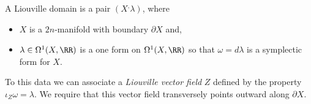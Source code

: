 
 
    A Liouville domain is a pair $(X^,\lambda)$, where
    \begin{itemize}
       \item $X$ is a $2n$-manifold with boundary $\partial X$ and,
       \item $\lambda\in \Omega^1(X, \RR)$ is a one form on $\Omega^1(X, \RR)$ so that $\omega=d\lambda$ is a symplectic form for $X$.
    \end{itemize}
 To this data we can associate a \emph{Liouville vector field} $Z$ defined by the property $\iota_Z\omega= \lambda$.
 We require that this vector field transversely points outward along $\partial X$.
 \label{def:liouvilleDomain}
 